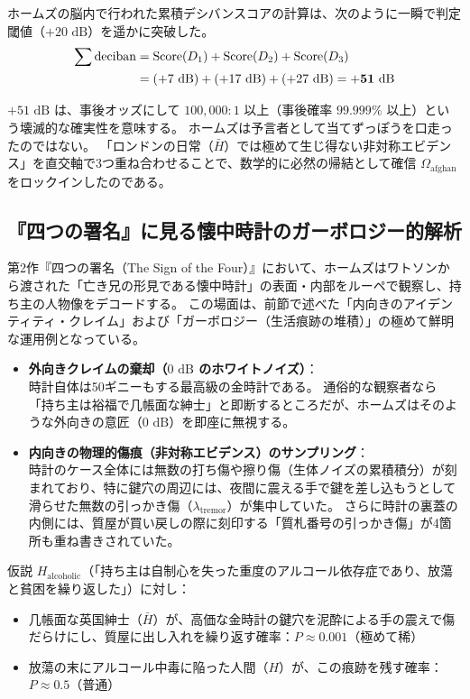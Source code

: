 ホームズの脳内で行われた累積デシバンスコアの計算は、次のように一瞬で判定閾値（$+20\text{ dB}$）を遥かに突破した。
\begin{align}
  \sum \text{deciban} &= \text{Score}(D_1) + \text{Score}(D_2) + \text{Score}(D_3) \notag \\
                      &= (+7\text{ dB}) + (+17\text{ dB}) + (+27\text{ dB}) = \mathbf{+51\text{ dB}}
\end{align}

$+51\text{ dB}$ は、事後オッズにして $100,000 : 1$ 以上（事後確率 $99.999\%$ 以上）という壊滅的な確実性を意味する。
ホームズは予言者として当てずっぽうを口走ったのではない。
「ロンドンの日常（$\bar{H}$）では極めて生じ得ない非対称エビデンス」を直交軸で3つ重ね合わせることで、数学的に必然の帰結として確信 $\Omega_{\mathrm{afghan}}$ をロックインしたのである。

\subsection{『四つの署名』に見る懐中時計のガーボロジー的解析}
第2作『四つの署名（The Sign of the Four）』において、ホームズはワトソンから渡された「亡き兄の形見である懐中時計」の表面・内部をルーペで観察し、持ち主の人物像をデコードする。
この場面は、前節で述べた「内向きのアイデンティティ・クレイム」および「ガーボロジー（生活痕跡の堆積）」の極めて鮮明な運用例となっている。

\begin{itemize}
  \item \textbf{外向きクレイムの棄却（$0\text{ dB}$ のホワイトノイズ）}：\\
  時計自体は50ギニーもする最高級の金時計である。
  通俗的な観察者なら「持ち主は裕福で几帳面な紳士」と即断するところだが、ホームズはそのような外向きの意匠（$0\text{ dB}$）を即座に無視する。
  
  \item \textbf{内向きの物理的傷痕（非対称エビデンス）のサンプリング}：\\
  時計のケース全体には無数の打ち傷や擦り傷（生体ノイズの累積積分）が刻まれており、特に鍵穴の周辺には、夜間に震える手で鍵を差し込もうとして滑らせた無数の引っかき傷（$\lambda_{\mathrm{tremor}}$）が集中していた。
  さらに時計の裏蓋の内側には、質屋が買い戻しの際に刻印する「質札番号の引っかき傷」が4箇所も重ね書きされていた。
\end{itemize}

仮説 $H_{\mathrm{alcoholic}}$（「持ち主は自制心を失った重度のアルコール依存症であり、放蕩と貧困を繰り返した」）に対し：
\begin{itemize}
  \item 几帳面な英国紳士（$\bar{H}$）が、高価な金時計の鍵穴を泥酔による手の震えで傷だらけにし、質屋に出し入れを繰り返す確率：$P \approx 0.001$（極めて稀）
  \item 放蕩の末にアルコール中毒に陥った人間（$H$）が、この痕跡を残す確率：$P \approx 0.5$（普通）
\end{itemize}

